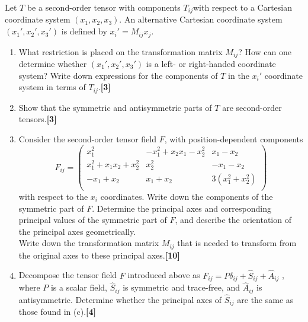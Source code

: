 \documentclass[a4paper]{article}
\begin{document}
\newpage
\begin{qns}[Tensors]
Let $T$ be a second-order tensor with components $T_{ij }$with respect to a Cartesian coordinate system $(x_1, x_2, x_3)$. An alternative Cartesian coordinate system $(x_1',x_2',x_3')$ is defined by $x_i'=M_{ij}x_j$.
\begin{enumerate}[label=(\alph*)]
\item What restriction is placed on the transformation matrix $M_{ij}$? How can one determine whether $(x_1',x_2',x_3')$ is a left- or right-handed coordinate system? Write down expressions for the components of $T$ in the $x_i'$ coordinate system in terms of $T_{ij}$.\hfill\textbf{[3]}
\item Show that the symmetric and antisymmetric parts of $T$ are second-order tensors.\hfill\textbf{[3]}
\item Consider the second-order tensor field $F$, with position-dependent components
$$F_{ij}=\begin{pmatrix}x_1^2&-x_1^2+x_2x_1-x_2^2&x_1-x_2\\x_1^2+x_1x_2+x_2^2&x_2^2&-x_1-x_2\\-x_1+x_2&x_1+x_2&3(x_1^2+x_2^2)\\\end{pmatrix}$$
with respect to the $x_i$ coordinates. Write down the components of the symmetric part of $F$. Determine the principal axes and corresponding principal values of the symmetric part of $F$, and describe the orientation of the principal axes geometrically.\\[5pt]
Write down the transformation matrix $M_{ij}$ that is needed to transform from the original axes to these principal axes.\hfill\textbf{[10]}
\item Decompose the tensor field $F$ introduced above as $F_{ij}=P\delta_{ij}+\hat{S}_{ij}+\hat{A}_{ij}$ , where $P$ is a scalar field, $\hat{S}_{ij}$ is symmetric and trace-free, and $\hat{A}_{ij}$ is antisymmetric. Determine whether the principal axes of $\hat{S}_{ij}$ are the same as those found in (c).\hfill\textbf{[4]}
\end{enumerate}
\end{qns}
\end{document}
